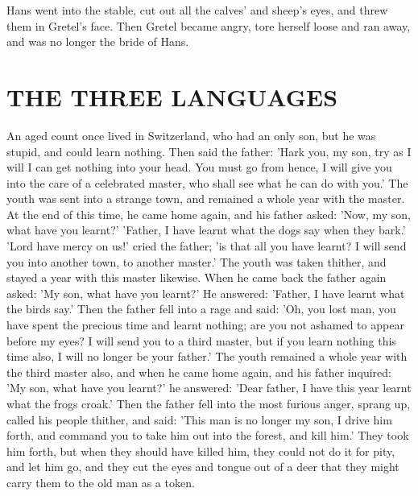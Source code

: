 \documentclass[12pt]{book}
\begin{document}
Hans went into the stable, cut out all the calves' and sheep's eyes,
and threw them in Gretel's face. Then Gretel became angry, tore
herself loose and ran away, and was no longer the bride of Hans.



\chapter{THE THREE LANGUAGES}

An aged count once lived in Switzerland, who had an only son, but he
was stupid, and could learn nothing. Then said the father: 'Hark you,
my son, try as I will I can get nothing into your head. You must go
from hence, I will give you into the care of a celebrated master, who
shall see what he can do with you.' The youth was sent into a strange
town, and remained a whole year with the master. At the end of this
time, he came home again, and his father asked: 'Now, my son, what
have you learnt?' 'Father, I have learnt what the dogs say when they
bark.' 'Lord have mercy on us!' cried the father; 'is that all you
have learnt? I will send you into another town, to another master.'
The youth was taken thither, and stayed a year with this master
likewise. When he came back the father again asked: 'My son, what have
you learnt?' He answered: 'Father, I have learnt what the birds say.'
Then the father fell into a rage and said: 'Oh, you lost man, you have
spent the precious time and learnt nothing; are you not ashamed to
appear before my eyes? I will send you to a third master, but if you
learn nothing this time also, I will no longer be your father.' The
youth remained a whole year with the third master also, and when he
came home again, and his father inquired: 'My son, what have you
learnt?' he answered: 'Dear father, I have this year learnt what the
frogs croak.' Then the father fell into the most furious anger, sprang
up, called his people thither, and said: 'This man is no longer my
son, I drive him forth, and command you to take him out into the
forest, and kill him.' They took him forth, but when they should have
killed him, they could not do it for pity, and let him go, and they
cut the eyes and tongue out of a deer that they might carry them to
the old man as a token.
\end{document}
